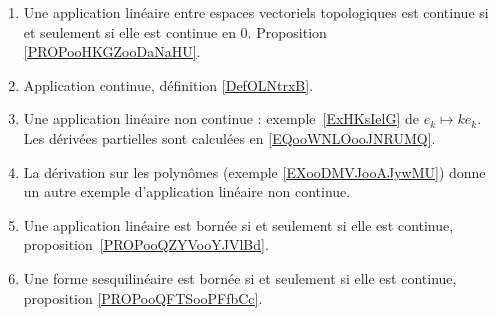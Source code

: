        \label{THEMEooYCBUooEnFdUg}
\begin{enumerate}
	\item
	      Une application linéaire entre espaces vectoriels topologiques est continue si et seulement si elle est continue en \( 0\). Proposition \ref{PROPooHKGZooDaNaHU}.
	\item
	      Application continue, définition \ref{DefOLNtrxB}.
	\item
	      Une application linéaire non continue : exemple~\ref{ExHKsIelG} de \( e_k\mapsto ke_k\). Les dérivées partielles sont calculées en \eqref{EQooWNLOooJNRUMQ}.
	\item
	      La dérivation sur les polynômes (exemple \ref{EXooDMVJooAJywMU}) donne un autre exemple d'application linéaire non continue.
	\item
	      Une application linéaire est bornée si et seulement si elle est continue, proposition~\ref{PROPooQZYVooYJVlBd}.
	\item
	      Une forme sesquilinéaire est bornée si et seulement si elle est continue, proposition \ref{PROPooQFTSooPFfbCc}.
\end{enumerate}
